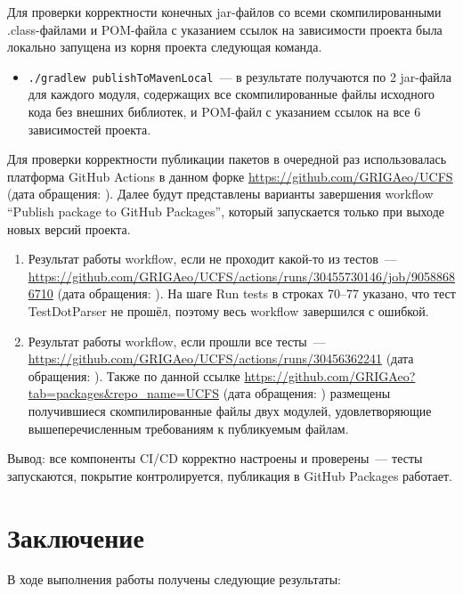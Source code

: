 \documentclass[a4paper]{article}
\begin{document}
Для проверки корректности конечных jar-файлов со всеми скомпилированными .class-файлами и POM-файла с указанием ссылок на зависимости проекта была локально запущена из корня проекта следующая команда.
\begin{itemize}
    \item \verb|./gradlew publishToMavenLocal|~--- в результате получаются по 2 jar-файла для каждого модуля, содержащих все скомпилированные файлы исходного кода без внешних библиотек, и POM-файл с указанием ссылок на все 6 зависимостей проекта.
\end{itemize}

Для проверки корректности публикации пакетов в очередной раз использовалась платформа GitHub Actions в данном форке \url{https://github.com/GRIGAeo/UCFS} (дата обращения: ). Далее будут представлены варианты завершения workflow \foreignquote{english}{Publish package to GitHub Packages}, который запускается только при выходе новых версий проекта.
\begin{enumerate}
    \item Результат работы workflow, если не проходит какой-то из тестов~--- \url{https://github.com/GRIGAeo/UCFS/actions/runs/30455730146/job/90588686710} (дата обращения: ). На шаге Run tests в строках 70--77 указано, что тест TestDotParser не прошёл, поэтому весь workflow завершился с ошибкой.
    \item Результат работы workflow, если прошли все тесты~--- \url{https://github.com/GRIGAeo/UCFS/actions/runs/30456362241} (дата обращения: ). Также по данной ссылке \url{https://github.com/GRIGAeo?tab=packages&repo_name=UCFS} (дата обращения: ) размещены получившиеся скомпилированные файлы двух модулей, удовлетворяющие вышеперечисленным требованиям к публикуемым файлам.
\end{enumerate}

Вывод: все компоненты CI/CD корректно настроены и проверены~--- тесты запускаются, покрытие контролируется, публикация в GitHub Packages работает.

\section{Заключение}

В ходе выполнения работы получены следующие результаты:
\end{document}
